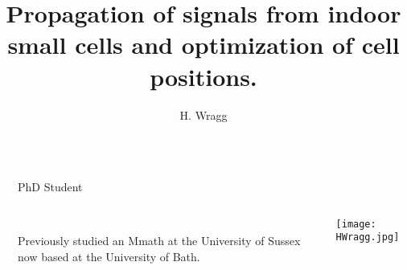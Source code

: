 \documentclass[final]{beamer}
\title{Propagation of signals from indoor small cells and optimization of cell positions.} %
\author{H. Wragg} %
\institute{University of Bath} %
\theoremstyle{plain}
\theoremstyle{definition}
\theoremstyle{remark}
\newlength{\sepwid}
\newlength{\onecolwid}
\begin{document}

\setlength{\belowcaptionskip}{2ex} %
\setlength{\belowdisplayshortskip}{2ex} %

\begin{frame}[t] %

\begin{columns}[t] %

\begin{column}{\sepwid}\end{column} %

\begin{column}{\onecolwid} %


  
    \begin{mdframed}[backgroundcolor=white, userdefinedwidth=0.999999\linewidth]
    \centering
    \center
  
    \end{mdframed}
    \vspace{1.5cm}
    
\begin{alertblock}{PhD Student}
\begin{columns} \begin{column}{0.75\linewidth}
\textbf{\insertauthor} \hspace{1cm}
 \\
Previously studied an Mmath at the University of Sussex now based at the University of Bath.
\end{column}
\begin{column}{0.25\linewidth}
\texttt{[image: HWragg.jpg]}
\end{column}
\end{columns}
\end{alertblock}


\end{column}
\end{columns}
\end{frame}
\end{document}
